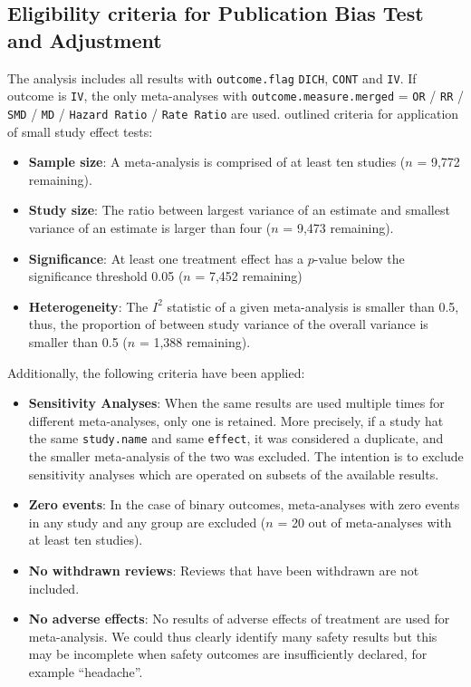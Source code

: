 \documentclass[11pt,a4paper,twoside]{book}\usepackage[]{graphicx}\usepackage[]{color}
\begin{document}
\subsection{Eligibility criteria for Publication Bias Test and Adjustment} 

The analysis includes all results with \texttt{outcome.flag} \texttt{DICH}, \texttt{CONT} and \texttt{IV}. If outcome is \texttt{IV}, the only meta-analyses with \texttt{outcome.measure.merged} = \texttt{OR} / \texttt{RR} / \texttt{SMD} / \texttt{MD} / \texttt{Hazard Ratio} / \texttt{Rate Ratio} are used. 
\citealp{Ioannidis2007} outlined criteria for application of small study effect tests:
\begin{itemize}
\item \textbf{Sample size}: A meta-analysis is comprised of at least ten studies ($n$ = 9,772 remaining). 
\item \textbf{Study size}: The ratio between largest variance of an estimate and smallest variance of an estimate is larger than four ($n$ = 9,473 remaining).
\item \textbf{Significance}: At least one treatment effect has a $p$-value below the significance threshold 0.05 ($n$ = 7,452 remaining)
\item \textbf{Heterogeneity}: The $I^2$ statistic of a given meta-analysis is smaller than 0.5, thus, the proportion of between study variance of the overall variance is smaller than 0.5 ($n$ = 1,388 remaining).
\end{itemize}
Additionally, the following criteria have been applied:
\begin{itemize}
\item \textbf{Sensitivity Analyses}: When the same results are used multiple times for different meta-analyses, only one is retained. More precisely, if a study hat the same \texttt{study.name} and same \texttt{effect}, it was considered a duplicate, and the smaller meta-analysis of the two was excluded. The intention is to exclude sensitivity analyses which are operated on subsets of the available results.
\item \textbf{Zero events}: In the case of binary outcomes, meta-analyses with zero events in any study and any group are excluded ($n$ = 20 out of meta-analyses with at least ten studies).
\item \textbf{No withdrawn reviews}: Reviews that have been withdrawn are not included.
\item \textbf{No adverse effects}: No results of adverse effects of treatment are used for meta-analysis. We could thus clearly identify many safety results but this may be incomplete when safety outcomes are insufficiently declared, for example ``headache''.
\end{itemize}
\end{document}
